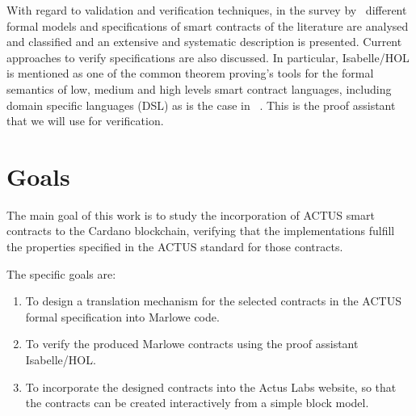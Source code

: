 \documentclass[12pt]{book}
\begin{document}
With regard to validation and verification techniques, in the survey by~\cite{10.1145/3464421} different formal models and specifications of smart contracts of the literature are analysed and classified and an extensive and systematic description is presented. Current approaches to verify specifications are also discussed. In particular, Isabelle/HOL is mentioned as one of the common theorem proving's tools for the formal semantics of low, medium and high levels smart contract languages, including domain specific languages (DSL) as is the case in ~\cite{10.1007/978-3-030-54455-3_35}. This is the proof assistant that we will use for verification.

\bigskip


\section{Goals}
\textcolor{darkbrown}
{
The main goal of this work is to study the incorporation of ACTUS smart contracts to the Cardano blockchain, verifying that the implementations fulfill the properties specified in the ACTUS standard for those contracts.
}

\textcolor{darkbrown}
{
The specific goals are:
}
\textcolor{darkbrown}
{
\begin{enumerate}
    \item To design a translation mechanism for the selected contracts in the ACTUS formal specification into Marlowe code.
    \item To verify the produced Marlowe contracts using the proof assistant Isabelle/HOL.
    \item To incorporate the designed contracts into the Actus Labs website, so that the contracts can be created interactively from a simple block model.%
\end{enumerate}
}

\bigskip



\end{document}
